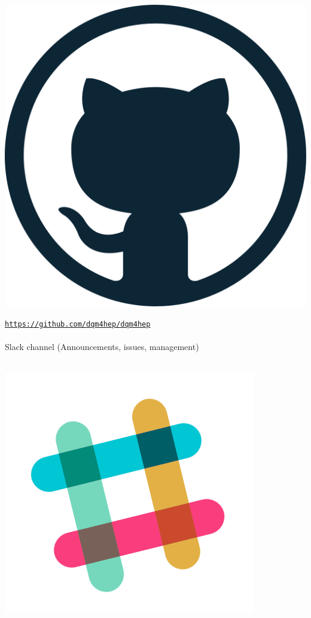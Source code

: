 \documentclass[presentation, 10pt]{beamer}
\begin{document}
\begin{frame}
\begin{minipage}{0.03\linewidth}
    \includegraphics[width=\linewidth]{figs/github-logo.png}
  \end{minipage}
  \href{https://github.com/dqm4hep/dqm4hep}{\tt https://github.com/dqm4hep/dqm4hep} \\
  ~\\
  Slack channel (Announcements, issues, management) \\
  \vspace*{0.1cm}
  ~~~
  \begin{minipage}{0.035\linewidth}
    \includegraphics[width=\linewidth]{figs/slack-logo.png}

\end{minipage}
\end{frame}
\end{document}
